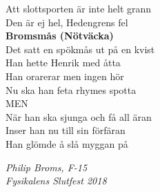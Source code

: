 \documentclass[a6paper,10pt]{article}
\begin{document}
Att slottsporten är inte helt grann\\
Den är ej hel, Hedengrens fel
\vspace{30pt}\\
\textbf{Bromsmås (Nötväcka)}
\vspace{5pt}\\
Det satt en spökmås ut på en kvist\\
Han hette Henrik med åtta\\
Han orarerar men ingen hör\\
Nu ska han feta rhymes spotta\\
MEN\\
När han ska sjunga och få all äran\\
Inser han nu till sin förfäran\\
Han glömde å slå myggan på

\begin{flushright}
\textit{Philip Broms, F-15 \\ Fysikalens Slutfest 2018}
\end{flushright}
\newpage
{}
\setlength{\oddsidemargin}{-0.37in}
\end{document}
